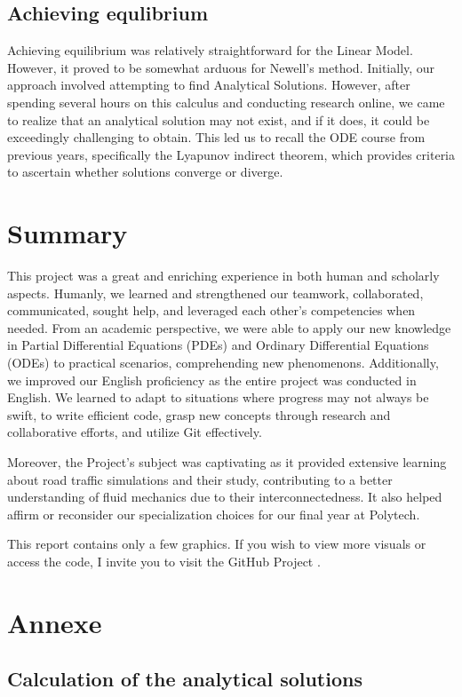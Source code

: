 \documentclass{article}
\begin{document}
	\subsection{Achieving equlibrium}
		Achieving equilibrium was relatively straightforward for the Linear Model. However, it proved to be somewhat arduous for Newell's method. Initially, our approach involved attempting to find Analytical Solutions. However, after spending several hours on this calculus and conducting research online, we came to realize that an analytical solution may not exist, and if it does, it could be exceedingly challenging to obtain. This led us to recall the ODE course from previous years, specifically the Lyapunov indirect theorem, which provides criteria to ascertain whether solutions converge or diverge.
	\section{Summary}
	
	This project was a great and enriching experience in both human and scholarly aspects. Humanly, we learned and strengthened our teamwork, collaborated, communicated, sought help, and leveraged each other's competencies when needed. From an academic perspective, we were able to apply our new knowledge in Partial Differential Equations (PDEs) and Ordinary Differential Equations (ODEs) to practical scenarios, comprehending new phenomenons. Additionally, we improved our English proficiency as the entire project was conducted in English. We learned to adapt to situations where progress may not always be swift, to write efficient code, grasp new concepts through research and collaborative efforts, and utilize Git effectively.
	
	Moreover, the Project's subject was captivating as it provided extensive learning about road traffic simulations and their study, contributing to a better understanding of fluid mechanics due to their interconnectedness. It also helped affirm or reconsider our specialization choices for our final year at Polytech.
	
	This report contains only a few graphics. If you wish to view more visuals or access the code, I invite you to visit the GitHub Project \cite{SMRT}.
	\newpage
	\section{Annexe}
	
	\subsection{Calculation of the analytical solutions}
	
\end{document}
